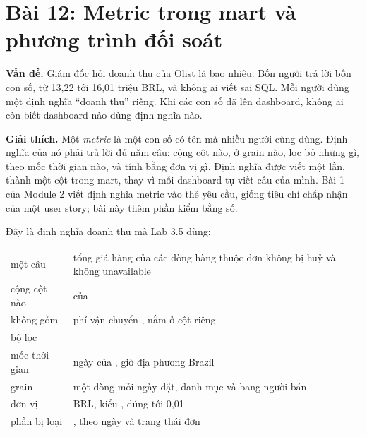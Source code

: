 \section{Bài 12: Metric trong mart và phương trình đối soát}

\textbf{Vấn đề.} Giám đốc hỏi doanh thu của Olist là bao nhiêu. Bốn người trả lời bốn con số, từ 13,22 tới 16,01 triệu BRL, và không ai viết sai SQL. Mỗi người dùng một định nghĩa ``doanh thu'' riêng. Khi các con số đã lên dashboard, không ai còn biết dashboard nào dùng định nghĩa nào.

\textbf{Giải thích.} Một \textit{metric} là một con số có tên mà nhiều người cùng dùng. Định nghĩa của nó phải trả lời đủ năm câu: cộng cột nào, ở grain nào, lọc bỏ những gì, theo mốc thời gian nào, và tính bằng đơn vị gì. Định nghĩa được viết một lần, thành một cột trong mart, thay vì mỗi dashboard tự viết câu  của mình. Bài 1 của Module 2 viết định nghĩa metric vào thẻ yêu cầu, giống tiêu chí chấp nhận của một user story; bài này thêm phần kiểm bằng số.

Đây là định nghĩa doanh thu mà Lab 3.5 dùng:

\begin{xltabular}{\textwidth}{@{}P{3.2cm} L@{}}
\toprule
{} &  \\
\midrule
\endhead
\bottomrule
\endfoot
một câu & tổng giá hàng của các dòng hàng thuộc đơn không bị huỷ và không unavailable \\
cộng cột nào &  của  \\
không gồm & phí vận chuyển , nằm ở cột  riêng \\
bộ lọc &  \\
mốc thời gian & ngày của , giờ địa phương Brazil \\
grain & một dòng mỗi ngày đặt, danh mục và bang người bán \\
đơn vị & BRL, kiểu , đúng tới 0,01 \\
phần bị loại & , theo ngày và trạng thái đơn \\
\end{xltabular}


